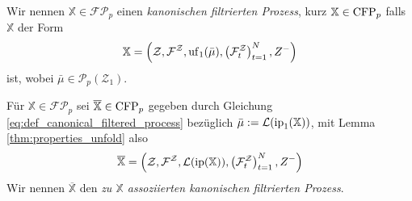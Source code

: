 \begin{definition}
    Wir nennen $\mathbb{X} \in \mathcal{FP}_p$ einen \emph{kanonischen filtrierten Prozess}, kurz $\mathbb{X} \in \operatorname{CFP}_p$ falls $\mathbb{X}$ der Form
    \begin{equation}\label{eq:def_canonical_filtered_process}
    \mathbb{X} = \left( \mathcal{Z}, \mathcal{F}^\mathcal{Z}, \operatorname{uf}_1(\bar{\mu}), \left(\mathcal{F}_t^\mathcal{Z}\right)_{t=1}^N, Z^-\right)
    \end{equation}
    ist, wobei $\bar{\mu} \in \mathcal{P}_p(\mathcal{Z}_1)$.
\end{definition}
\begin{definition}
    Für $\mathbb{X} \in \mathcal{FP}_p$ sei $\overline{\mathbb{X}} \in \operatorname{CFP}_p$ gegeben durch Gleichung \ref{eq:def_canonical_filtered_process} bezüglich $\bar\mu := \mathcal{L}(\operatorname{ip}_1(\mathbb{X}))$, mit Lemma \ref{thm:properties_unfold} also
    \begin{equation}\label{eq:associated_process}
        \overline{\mathbb{X}} = \left( \mathcal{Z}, \mathcal{F}^\mathcal{Z}, \mathcal{L}(\operatorname{ip}(\mathbb{X})), \left(\mathcal{F}_t^\mathcal{Z}\right)_{t=1}^N, Z^-\right)
    \end{equation}
    Wir nennen $\overline{\mathbb{X}}$ den \emph{zu $\mathbb{X}$ assoziierten kanonischen filtrierten Prozess}.
\end{definition}

